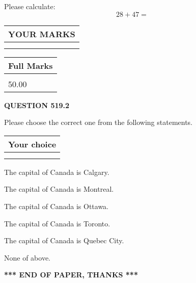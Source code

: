 \documentclass[12pt]{article}
\begin{document}
  
 
Please calculate:
\begin{equation}
28 +  %
47 = \nonumber
\end{equation}
 

 

 
  
\vspace{0.2in}
  
\noindent\begin{tabular}{|l|}
\hline
 YOUR MARKS  \\
\hline
 \\ 
 \\ 
\hline
\end{tabular}
\hspace{0.05in} \begin{tabular}{|l|}
\hline
 Full Marks  \\
\hline
 \\ 
50.00 \\
\hline
\end{tabular}
{\textbf{\Large{QUESTION
519.2 
}}}
  
  
Please choose the correct one from the following statements.
  
  
\noindent\hspace{3.0in} \begin{tabular}{|l|}
\hline
Your choice \\
\hline
 \\ 
 \\ 
\hline
\end{tabular}
  
  
 
 
The capital of Canada is Calgary.
 
 
The capital of Canada is Montreal.
 
 
The capital of Canada is Ottawa.
 
 
The capital of Canada is Toronto.
 
 
The capital of Canada is Quebec City.
 
 
 None of above.
 
 
   
   
 \vspace{0.2in}
 
   
   
   
   
\vspace{1.0in} 
{\textbf{\large{ *** END OF PAPER, THANKS *** }}} 
   
\end{document}
